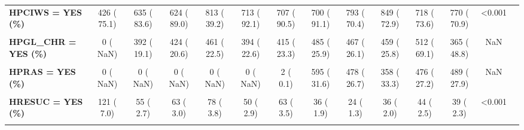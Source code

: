 \documentclass[
]{article}
\begin{document}
\begin{table}[H]
\begin{tabular}[t]{>{\raggedright\arraybackslash}p{5em}ccccccccccccc}
\textbf{HPCIWS = YES (\%)} & 426 ( 75.1) & 635 ( 83.6) & 624 ( 89.0) & 813 ( 39.2) & 713 ( 92.1) & 707 ( 90.5) & 700 ( 91.1) & 793 ( 70.4) & 849 ( 72.9) & 718 ( 73.6) & 770 ( 70.9) & <0.001 & \\
\textbf{\cellcolor{gray!10}{HPCLS = DURING/AFTER PCI (\%)}} & \cellcolor{gray!10}{0 (  NaN)} & \cellcolor{gray!10}{0 (  NaN)} & \cellcolor{gray!10}{0 (  NaN)} & \cellcolor{gray!10}{218 ( 27.7)} & \cellcolor{gray!10}{168 ( 24.2)} & \cellcolor{gray!10}{59 (  8.1)} & \cellcolor{gray!10}{52 (  7.0)} & \cellcolor{gray!10}{130 ( 20.5)} & \cellcolor{gray!10}{84 ( 15.4)} & \cellcolor{gray!10}{116 ( 26.8)} & \cellcolor{gray!10}{196 ( 47.8)} & \cellcolor{gray!10}{NaN} & \cellcolor{gray!10}{}\\
\textbf{HPGL\_CHR = YES (\%)} & 0 (  NaN) & 392 ( 19.1) & 424 ( 20.6) & 461 ( 22.5) & 394 ( 22.6) & 415 ( 23.3) & 485 ( 25.9) & 467 ( 26.1) & 459 ( 25.8) & 512 ( 69.1) & 365 ( 48.8) & NaN & \\
\textbf{\cellcolor{gray!10}{HPLAT = YES (\%)}} & \cellcolor{gray!10}{298 ( 17.5)} & \cellcolor{gray!10}{1001 ( 48.9)} & \cellcolor{gray!10}{1591 ( 76.0)} & \cellcolor{gray!10}{1710 ( 83.3)} & \cellcolor{gray!10}{1540 ( 88.8)} & \cellcolor{gray!10}{1684 ( 94.7)} & \cellcolor{gray!10}{1797 ( 95.4)} & \cellcolor{gray!10}{1622 ( 90.7)} & \cellcolor{gray!10}{0 (  NaN)} & \cellcolor{gray!10}{0 (  NaN)} & \cellcolor{gray!10}{0 (  NaN)} & \cellcolor{gray!10}{NaN} & \cellcolor{gray!10}{}\\
\textbf{HPRAS = YES (\%)} & 0 (  NaN) & 0 (  NaN) & 0 (  NaN) & 0 (  NaN) & 0 (  NaN) & 2 (  0.1) & 595 ( 31.6) & 478 ( 26.7) & 358 ( 33.3) & 476 ( 27.2) & 489 ( 27.9) & NaN & \\
\textbf{\cellcolor{gray!10}{HREOP = YES (\%)}} & \cellcolor{gray!10}{201 ( 12.3)} & \cellcolor{gray!10}{15 (  0.7)} & \cellcolor{gray!10}{2 (  0.1)} & \cellcolor{gray!10}{9 (  0.4)} & \cellcolor{gray!10}{2 (  0.1)} & \cellcolor{gray!10}{2 (  0.1)} & \cellcolor{gray!10}{1 (  0.1)} & \cellcolor{gray!10}{0 (  NaN)} & \cellcolor{gray!10}{0 (  NaN)} & \cellcolor{gray!10}{0 (  NaN)} & \cellcolor{gray!10}{0 (  NaN)} & \cellcolor{gray!10}{NaN} & \cellcolor{gray!10}{}\\
\textbf{HRESUC = YES (\%)} & 121 (  7.0) & 55 (  2.7) & 63 (  3.0) & 78 (  3.8) & 50 (  2.9) & 63 (  3.5) & 36 (  1.9) & 24 (  1.3) & 36 (  2.0) & 44 (  2.5) & 39 (  2.3) & <0.001 & \\
\textbf{\cellcolor{gray!10}{HSGC = YES (\%)}} & \cellcolor{gray!10}{25 (  1.4)} & \cellcolor{gray!10}{11 (  0.5)} & \cellcolor{gray!10}{7 (  0.3)} & \cellcolor{gray!10}{0 (  NaN)} & \cellcolor{gray!10}{0 (  NaN)} & \cellcolor{gray!10}{0 (  NaN)} & \cellcolor{gray!10}{0 (  NaN)} & \cellcolor{gray!10}{0 (  NaN)} & \cellcolor{gray!10}{0 (  NaN)} & \cellcolor{gray!10}{0 (  NaN)} & \cellcolor{gray!10}{0 (  NaN)} & \cellcolor{gray!10}{NaN} & \cellcolor{gray!10}{}\\

\end{tabular}
\end{table}
\end{document}
